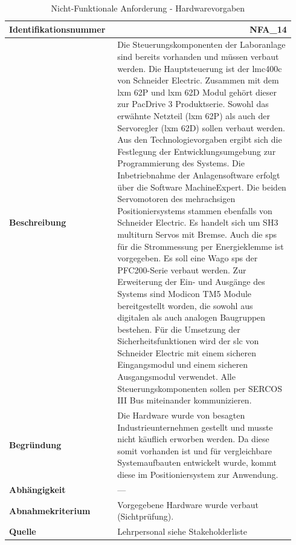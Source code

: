 \documentclass[../../../Bachelorarbeit.tex]{subfiles}
\begin{document}
\begin{table}[H]
    \centering
    \begin{tabular}{ p{0.34\linewidth}  p{0.6\linewidth} }
        \hline
        \textbf{Identifikationsnummer}  & \multicolumn{1}{r}{NFA\_14} \\ \hline
        \textbf{Beschreibung}           & Die Steuerungskomponenten der Laboranlage sind bereits vorhanden und müssen verbaut werden. Die Hauptsteuerung ist der \acs{lmc}400c von Schneider Electric. Zusammen mit dem \acs{lxm} 62P und \acs{lxm} 62D Modul gehört dieser zur PacDrive 3 Produktserie. Sowohl das erwähnte Netzteil (\acs{lxm} 62P) als auch der Servoregler (\acs{lxm} 62D) sollen verbaut werden. Aus den Technologievorgaben ergibt sich die Festlegung der Entwicklungsumgebung zur Programmierung des Systems. Die Inbetriebnahme der Anlagensoftware erfolgt über die Software MachineExpert. Die beiden Servomotoren des mehrachsigen Positioniersystems stammen ebenfalls von Schneider Electric. Es handelt sich um SH3 multiturn Servos mit Bremse. Auch die \acs{sps} für die Strommessung per Energieklemme ist vorgegeben. Es soll eine Wago \acs{sps} der PFC200-Serie verbaut werden. Zur Erweiterung der Ein- und Ausgänge des Systems sind Modicon TM5 Module bereitgestellt worden, die sowohl aus digitalen als auch analogen Baugruppen bestehen. Für die Umsetzung der Sicherheitsfunktionen wird der \acs{slc} von Schneider Electric mit einem sicheren Eingangsmodul und einem sicheren Ausgangsmodul verwendet. Alle Steuerungskomponenten sollen per SERCOS III Bus miteinander kommunizieren. \\
        \textbf{Begründung}             & Die Hardware wurde von besagten Industrieunternehmen gestellt und musste nicht käuflich erworben werden. Da diese somit vorhanden ist und für vergleichbare Systemaufbauten entwickelt wurde, kommt diese im Positioniersystem zur Anwendung. \\
        \textbf{Abhängigkeit}           & --- \\
        \textbf{Abnahmekriterium}       & Vorgegebene Hardware wurde verbaut (Sichtprüfung). \\
        \textbf{Quelle}                 & Lehrpersonal siehe Stakeholderliste \\ \hline
    \end{tabular}
    \caption[\acs{nfa} - Hardwarevorgaben]{Nicht-Funktionale Anforderung - Hardwarevorgaben}
    \label{tab:my-table20}
\end{table}

\end{document}
